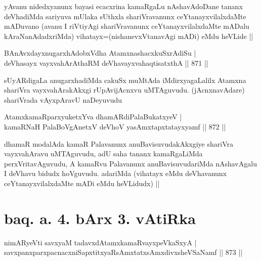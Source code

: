 \begin{artha}
yAvanu nidedxyanunx bayasi ecacxrina kamaRgaLu nAshavAdoDane tananx deVhadiMda sariyuva mUlaka sUthxla shariVravanunx ceYtanayxvilalxdaMte mADuvano (avanu I riVtiyAgi shariVravanunx ceYtanayxvilalxdaMte mADalu kAraNanAdadxriMda) vihatayx=(nishanevxVtanavAgi mADi) eMdu heVLide ||
\end{artha}


\begin{shl}
BAnAvxdayxnugarxhAdobxVdha AtamxnashacxkuSxrAdiSu | \\
deVhasayx vayxvahArAthaRM deVhavayxvahaqtisatxthA \hfill||  871 ||  
\end{shl}

\begin{artha}
sUyARdigaLa anugarxhadiMda cakuSx muMtAda iMdirxyagaLalilx Atamxna shariVra vayxvahArakAkxgi rUpAvijAcnxvu uMTAguvudu. (jAcnxnavAdare) shariVrada vAyxpAravU naDeyuvudu
\end{artha}


\begin{shl}
AtamxkamaRparxyuketxYva dhamARdiPalaBukatxyeV | \\
kamaRNaH PalaBoVgAnetxV deVhoV yasAmxtapxtatayxyamf \hfill||  872 ||  
\end{shl}

\begin{artha}
dhamaR modalAda kamaR Palavanunx anuBavisuvudakAkxgiye shariVra vayxvahAravu uMTAguvudu, adU saha tananx kamaRgaLiMda perxVritavAguvudu, A kamaRvu Palavanunx anuBavisuvudariMda nAshavAgalu I deVhavu bidudx hoVguvudu. adariMda (vihatayx eMdu deVhavanunx ceYtanayxvilalxdaMte mADi eMdu heVLidudx) ||
\end{artha}

\section*{baq. a. 4. bArx 3. vAtiRka}


\begin{shl}
nimARyeVti savxyaM tadavxdAtamxkamaRvayxpeVkaSxyA | \\
savxpanxparxpacnacxniSapxtitxyaRsAmxtatxsAmxdivxsheVSaNamf \hfill||  873 ||  
\end{shl}

